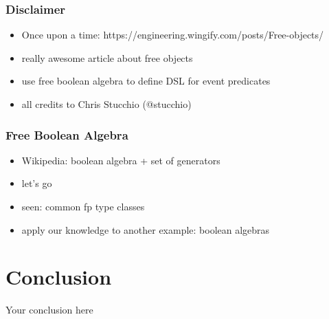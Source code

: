 \documentclass{beamer}
\begin{document}
\begin{frame}
  \frametitle{Disclaimer}
  \begin{itemize}
  \item Once upon a time: https://engineering.wingify.com/posts/Free-objects/
  \item really awesome article about free objects
  \item use free boolean algebra to define DSL for event predicates
  \item all credits to Chris Stucchio (@stucchio)
  \end{itemize}
\end{frame}

\begin{frame}
  \frametitle{Free Boolean Algebra}
  \begin{itemize}
  \item Wikipedia: boolean algebra + set of generators
  \item let's go
  \end{itemize}
\end{frame}

\begin{frame}
  \begin{itemize}
  \item seen: common fp type classes
  \item apply our knowledge to another example: boolean algebras
  \end{itemize}
\end{frame}

\section{Conclusion}\label{sec:conclusion}

\begin{frame}
  \begin{center}
    \huge
    Your conclusion here
  \end{center}
\end{frame}
\end{document}

